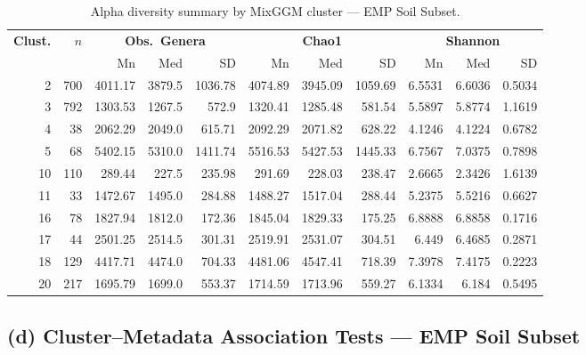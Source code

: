 \documentclass[12pt, oneside]{report}
\begin{document}
\begin{table}[H]
\centering
\caption[Alpha diversity by cluster --- EMP Soil Subset]{Alpha diversity summary by MixGGM cluster --- EMP Soil Subset.}
\label{tab:supp3c}
\small
\begin{tabular}{rr rrr rrr rrr}
\toprule
\textbf{Clust.} & \textbf{$n$} &
\multicolumn{3}{c}{\textbf{Obs.\ Genera}} &
\multicolumn{3}{c}{\textbf{Chao1}} &
\multicolumn{3}{c}{\textbf{Shannon}} \\
\cmidrule(lr){3-5}\cmidrule(lr){6-8}\cmidrule(lr){9-11}
& & Mn & Med & SD & Mn & Med & SD & Mn & Med & SD \\
\midrule
2 & 700 & 4011.17 & 3879.5 & 1036.78 & 4074.89 & 3945.09 & 1059.69 & 6.5531 & 6.6036 & 0.5034 \\
3 & 792 & 1303.53 & 1267.5 & 572.9 & 1320.41 & 1285.48 & 581.54 & 5.5897 & 5.8774 & 1.1619 \\
4 & 38 & 2062.29 & 2049.0 & 615.71 & 2092.29 & 2071.82 & 628.22 & 4.1246 & 4.1224 & 0.6782 \\
5 & 68 & 5402.15 & 5310.0 & 1411.74 & 5516.53 & 5427.53 & 1445.33 & 6.7567 & 7.0375 & 0.7898 \\
10 & 110 & 289.44 & 227.5 & 235.98 & 291.69 & 228.03 & 238.47 & 2.6665 & 2.3426 & 1.6139 \\
11 & 33 & 1472.67 & 1495.0 & 284.88 & 1488.27 & 1517.04 & 288.44 & 5.2375 & 5.5216 & 0.6627 \\
16 & 78 & 1827.94 & 1812.0 & 172.36 & 1845.04 & 1829.33 & 175.25 & 6.8888 & 6.8858 & 0.1716 \\
17 & 44 & 2501.25 & 2514.5 & 301.31 & 2519.91 & 2531.07 & 304.51 & 6.449 & 6.4685 & 0.2871 \\
18 & 129 & 4417.71 & 4474.0 & 704.33 & 4481.06 & 4547.41 & 718.39 & 7.3978 & 7.4175 & 0.2223 \\
20 & 217 & 1695.79 & 1699.0 & 553.37 & 1714.59 & 1713.96 & 559.27 & 6.1334 & 6.184 & 0.5495 \\
\bottomrule
\end{tabular}
\end{table}

\subsection*{(d) Cluster--Metadata Association Tests --- EMP Soil Subset}
\end{document}
